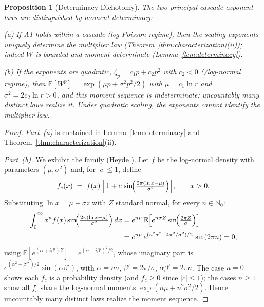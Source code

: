 \documentclass[12pt]{amsart}
\newtheorem{proposition}[theorem]{Proposition}
\theoremstyle{definition}
\theoremstyle{remark}
\begin{document}
\begin{proposition}[Determinacy Dichotomy]\label{prop:determinacy}
The two principal cascade exponent laws are distinguished by moment
determinacy:

\textup{(a)} If A1 holds within a cascade (log-Poisson regime), then
the scaling exponents uniquely determine the multiplier law
(Theorem~\textup{\ref{thm:characterization}(ii)}); indeed $W$ is
bounded and moment-determinate
(Lemma~\textup{\ref{lem:determinacy}}).

\textup{(b)} If the exponents are quadratic, $\zeta_p = c_1 p +
c_2 p^2$ with $c_2 < 0$ (\textup{\cite{K62}}/log-normal regime),
then $\mathbb{E}[W^p] = \exp(\mu p + \sigma^2 p^2/2)$ with $\mu =
c_1\ln r$ and $\sigma^2 = 2c_2\ln r > 0$, and this moment sequence is
indeterminate: uncountably many distinct laws realize it.  Under
quadratic scaling, the exponents cannot identify the multiplier law.
\end{proposition}

\begin{proof}
\textit{Part~\textup{(a)}} is contained in
Lemma~\ref{lem:determinacy} and
Theorem~\ref{thm:characterization}(ii).

\textit{Part~\textup{(b)}.}  We exhibit the family (Heyde
\cite{Hey63}).  Let $f$ be the log-normal density with parameters
$(\mu, \sigma^2)$ and, for $|c| \le 1$, define
\[
  f_c(x) \;=\; f(x)\,\Bigl[\,1 + c\,
  \sin\!\Bigl(\tfrac{2\pi(\ln x - \mu)}{\sigma^2}\Bigr)\Bigr],
  \qquad x > 0 .
\]
Substituting $\ln x = \mu + \sigma z$ with $Z$ standard normal, for
every $n \in \mathbb{N}_0$:
\[
\begin{aligned}
  \int_0^\infty x^n f(x)
  \sin\!\Bigl(\tfrac{2\pi(\ln x-\mu)}{\sigma^2}\Bigr)\,dx
  &= e^{n\mu}\,\mathbb{E}\Bigl[e^{n\sigma Z}
    \sin\!\Bigl(\tfrac{2\pi Z}{\sigma}\Bigr)\Bigr]\\
  &= e^{n\mu}\, e^{(n^2\sigma^2 - 4\pi^2/\sigma^2)/2}\,
    \sin(2\pi n) = 0,
\end{aligned}
\]
using $\mathbb{E}[e^{(\alpha+i\beta')Z}] = e^{(\alpha+i\beta')^2/2}$,
whose imaginary part is $e^{(\alpha^2-\beta'^2)/2}\allowbreak\sin(\alpha\beta')$,
with $\alpha = n\sigma$, $\beta' = 2\pi/\sigma$, $\alpha\beta' =
2\pi n$.  The case $n = 0$ shows each $f_c$ is a probability density
(and $f_c \ge 0$ since $|c| \le 1$); the cases $n \ge 1$ show all
$f_c$ share the log-normal moments $\exp(n\mu + n^2\sigma^2/2)$.
Hence uncountably many distinct laws realize the moment sequence.
\end{proof}
\end{document}
